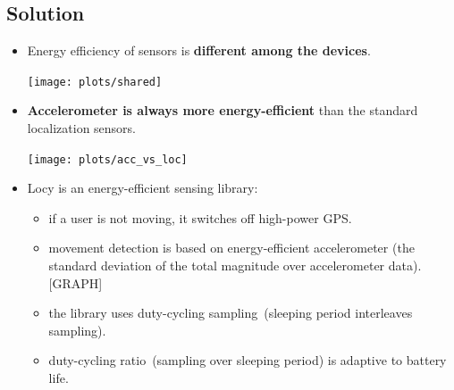 \documentclass[a2,landscape]{a0poster}
\begin{document}
\mbox{}\framebreak
\begin{center}
\section*{Solution}
\end{center}
\begin{itemize}
   \item Energy efficiency of sensors is \textbf{different among the devices}.
   
\texttt{[image: plots/shared]}

   \item \textbf{Accelerometer is always more energy-efficient} than the standard localization sensors.

\texttt{[image: plots/acc\_vs\_loc]}

   \item Locy is an energy-efficient sensing library:
  	   \begin{itemize}		
  	   \item if a user is not moving, it switches off high-power GPS. 
  	   \item movement detection is based on energy-efficient accelerometer (the standard deviation of the total magnitude over accelerometer data). [GRAPH]
  	   \item the library uses duty-cycling sampling\ (sleeping period interleaves sampling).
  	   \item duty-cycling ratio\ (sampling over sleeping period) is adaptive to battery life. 
    \end{itemize} 
  \end{itemize}
\end{document}
